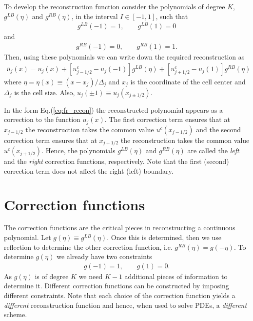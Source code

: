 \documentclass[11pt, reqno]{amsart}
\newcommand{\eqr}[1]{Eq.\thinspace(#1)}
\theoremstyle{definition}
\begin{document}
To develop the reconstruction function consider the polynomials of
degree $K$, $g^{LB}(\eta)$ and $g^{RB}(\eta)$, in the interval $I\in
[-1,1]$, such that
\begin{align}
  g^{LB}(-1) = 1, \qquad
  g^{LB}(1) = 0 \label{eq:glb}
\end{align}
and 
\begin{align}
  g^{RB}(-1) = 0, \qquad
  g^{RB}(1) = 1. \label{eq:grb}
\end{align}
Then, using these polynomials we can write down the required
reconstruction as
\begin{align}\label{eq:fr_recon}
  \boxed{
  \bar{u}_j(x)
  =
  u_j(x)
  +
  [u^c_{j-1/2} - u_j(-1)]g^{LB}(\eta)
  +
  [u^c_{j+1/2} - u_j(1)]g^{RB}(\eta)
}
\end{align}
where $\eta = \eta(x) \equiv (x-x_j)/\Delta_j$ and $x_j$ is the
coordinate of the cell center and $\Delta_j$ is the cell size. Also,
$u_j(\pm 1) \equiv u_j(x_{j\pm 1/2})$.

In the form \eqr{\ref{eq:fr_recon}} the reconstructed polynomial
appears as a correction to the function $u_j(x)$. The first correction
term ensures that at $x_{j-1/2}$ the reconstruction takes the common
value $u^c(x_{j-1/2})$ and the second correction term ensures that at
$x_{j+1/2}$ the reconstruction takes the common value
$u^c(x_{j+1/2})$. Hence, the polynomials $g^{LB}(\eta)$ and
$g^{RB}(\eta)$ are called the \emph{left} and the \emph{right}
correction functions, respectively. Note that the first
(second) correction term does not affect the right (left) boundary.

\section{Correction functions}

The correction functions are the critical pieces in reconstructing a
continuous polynomial. Let $g(\eta)\equiv g^{LB}(\eta)$. Once this is
determined, then we use reflection to determine the other correction
function, i.e. $g^{RB}(\eta) = g(-\eta)$. To determine $g(\eta)$ we
already have two constraints
\begin{align}\label{eq:gcond}
  g(-1) = 1, \qquad g(1) = 0.
\end{align}
As $g(\eta)$ is of degree $K$ we need $K-1$ additional pieces of
information to determine it. Different correction functions can be
constructed by imposing different constraints. Note that each choice
of the correction function yields a \emph{different} reconstruction
function and hence, when used to solve PDEs, a \emph{different}
scheme.
\end{document}
